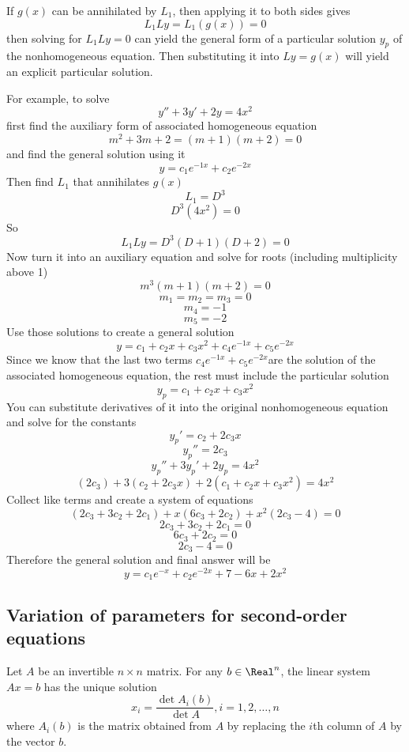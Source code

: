 If $g(x)$ can be annihilated by $L_1$, then applying it to both sides gives
\[
    L_1 Ly = L_1(g(x)) = 0
\]
then solving for $L_1 Ly = 0$ can yield the general form of a particular solution $y_p$ of the nonhomogeneous equation. Then substituting it into $Ly = g(x)$ will yield an explicit particular solution.

For example, to solve
\[
    y'' + 3y' + 2y = 4x^2
\]
first find the auxiliary form of associated homogeneous equation
\[
    m^2 + 3m + 2 = (m + 1)(m + 2) = 0
\]
and find the general solution using it
\[
    y = c_1 e^{-1x} + c_2 e^{-2x}
\]
Then find $L_1$ that annihilates $g(x)$
\[
    L_1 = D^3
\]
\[
    D^3 (4x^2) = 0
\]
So
\[
    L_1 Ly = D^3 (D + 1)(D + 2) = 0
\]
Now turn it into an auxiliary equation and solve for roots (including multiplicity above 1)
\[
    m^3 (m + 1)(m + 2) = 0
\]
\[
    m_1 = m_2 = m_3 = 0
\]
\[
    m_4 = -1
\]
\[
    m_5 = -2
\]
Use those solutions to create a general solution
\[
    y = c_1 + c_2 x + c_3 x^2 + c_4 e^{-1x} + c_5 e^{-2 x}
\]
Since we know that the last two terms $c_4 e^{-1x} + c_5 e^{-2 x}$are the solution of the associated homogeneous equation, the rest must include the particular solution
\[
    y_p = c_1 + c_2 x + c_3 x^2
\]
You can substitute derivatives of it into the original nonhomogeneous equation and solve for the constants
\[
    y_p' = c_2 + 2c_3 x
\]
\[
    y_p'' = 2c_3
\]
\[
    y_p'' + 3y_p' + 2y_p = 4x^2
\]
\[
    (2c_3) + 3(c_2 + 2c_3 x) + 2(c_1 + c_2 x + c_3 x^2) = 4x^2
\]
Collect like terms and create a system of equations
\[
    (2c_3 + 3c_2 + 2c_1) + x(6c_3 + 2c_2) + x^2 (2c_3 - 4) = 0
\]
\[
    2c_3 + 3c_2 + 2c_1 = 0
\]
\[
    6c_3 + 2c_2 = 0
\]
\[
    2c_3 - 4 = 0
\]
Therefore the general solution and final answer will be
\[
    y = c_1 e^{-x} + c_2 e^{-2x} + 7 - 6x + 2x^2
\]

\subsection{Variation of parameters for second-order equations}

\begin{theorem}
    Let $A$ be an invertible $n \times n$ matrix. For any $b \in \Real^n$, the linear system $Ax = b$ has the unique solution
    \[
        x_i = \frac{\det A_i(b)}{\det A}, i = 1, 2, \ldots, n
    \]
    where $A_i(b)$ is the matrix obtained from $A$ by replacing the $i$th column of $A$ by the vector $b$.
\end{theorem}

